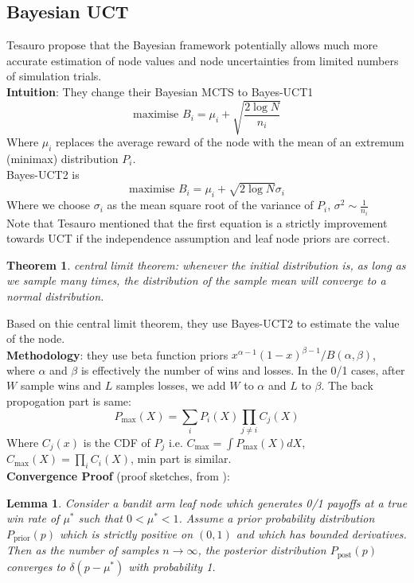 \documentclass[11pt]{article}
\theoremstyle{definitionstyle}
\newtheorem{thm}{Theorem}
\newtheorem{lem}{Lemma}
\newenvironment{framedminipage}
    {\begin{framed}\begin{minipage}{0.9\textwidth}}
    {\end{minipage}\end{framed}}
\begin{document}
\subsection{Bayesian UCT}
Tesauro\cite{tesauro2012bayesian} propose that the Bayesian framework potentially allows much more accurate estimation of node values and node uncertainties from limited numbers of simulation trials.\\
\textbf{Intuition}: They change their Bayesian MCTS to Bayes-UCT1
\[
    \text{maximise } B_i=\mu_i+\sqrt{\frac{2\log N}{n_i}}
\]
Where $\mu_i$ replaces the average reward of the node with the mean of an extremum (minimax) distribution $P_i$.\\
Bayes-UCT2 is
\[
    \text{maximise } B_i=\mu_i+\sqrt{2\log N}\sigma_i
\]
Where we choose $\sigma_i$ as the mean square root of the variance of $P_i$, $\sigma^2\sim\frac{1}{n_i}$\\
Note that Tesauro mentioned that the first equation is a strictly improvement towards UCT if the independence assumption
and leaf node priors are correct.\\
\begin{framedminipage}
\begin{thm} 
central limit theorem: whenever the initial distribution is, as long as we sample many times, the distribution of the sample mean will converge to a normal distribution.
\end{thm}
\end{framedminipage}
Based on thie central limit theorem, they use Bayes-UCT2 to estimate the value of the node.\\
\textbf{Methodology}: they use beta function priors $x^{\alpha-1}(1-x)^{\beta-1}/B(\alpha,\beta)$, where $\alpha$ and $\beta$ is effectively the number of wins and losses. In the 0/1 cases, after $W$ sample wins and $L$ samples losses, we add $W$ to $\alpha$ and $L$ to $\beta$. The back propogation part is same:
\[
    P_{\text{max}}(X)=\sum_i P_i(X)\prod_{j\neq i}C_j(X)
\]
Where $C_j(x)$ is the CDF of $P_j$ i.e. $C_\text{max}=\int P_\text{max}(X)dX$, $C_\text{max}(X)=\prod_i C_i(X)$, min part is similar.\\
\textbf{Convergence Proof} (proof sketches, from \cite{tesauro2012bayesian}):\\
\begin{framedminipage}
\begin{lem} Consider a bandit arm leaf node which generates 0/1 payoffs at a true win rate of $\mu^*$ such that $0 < \mu^* < 1$. Assume a prior probability distribution $P_{\text{prior}}(p)$ which is strictly positive on $(0, 1)$ and which has bounded derivatives. Then as the number of samples $n \to \infty$, the posterior distribution $P_{\text{post}}(p)$ converges to $\delta(p - \mu^*)$ with probability 1.
\end{lem}
\end{framedminipage}
\end{document}
